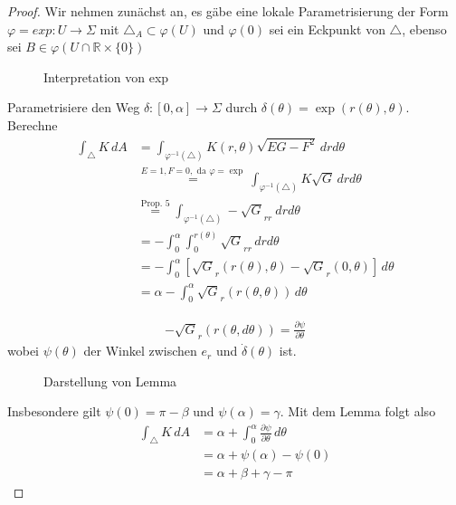 \documentclass[../main.tex]{subfiles}
\begin{document}
\begin{proof}
    Wir nehmen zunächst an, es gäbe eine lokale Parametrisierung der Form
    \(\varphi = exp : U \to \Sigma\) mit \(\triangle_A \subset \varphi(U)\)
    und \(\varphi(0)\) sei ein Eckpunkt von $\triangle$, ebenso sei $B \in \varphi (U\cap \mathbb{R} \times \{0\})$
    
    \begin{figure}[htb]
        \centering
        \def\svgwidth{40em}
        
        \caption{Interpretation von exp}        
    \end{figure}


Parametrisiere den Weg $\delta : [0,\alpha] \to \Sigma$ durch $\delta(\theta) = \exp(r(\theta), \theta)$. Berechne
\begin{align*}
    \int_{\triangle} K \,dA & = \int_{\varphi^{-1}(\triangle)} K(r,\theta) \sqrt{EG-F^{2}}\,drd\theta \\
    & \overset{E=1, F=0, \text{ da } \varphi = \exp}{=}\int_{\varphi^{-1}(\triangle)} K\sqrt{G}  \,drd\theta \\ 
    & \overset{\text{Prop. 5}}{=} \int_{\varphi^{-1}(\triangle)} -\sqrt{G}_{rr} \ drd\theta \\
    & = - \int_{0}^{\alpha} \int_{0}^{r(\theta)} \sqrt{G}_{rr}\,drd\theta \\
    & = - \int_{0}^{\alpha} \left [\sqrt{G}_r (r(\theta), \theta) - \sqrt{G}_r(0,\theta) \right ] \,d\theta \\
    & = \alpha - \int_{0}^{\alpha} \sqrt{G}_r (r(\theta,\theta))  \,d\theta 
\end{align*}

\begin{lemma*}
    \begin{align*}
        -\sqrt{G}_r (r(\theta, d\theta)) = \frac{\partial \psi}{\partial \theta}
    \end{align*} wobei $\psi(\theta)$ der Winkel zwischen $e_r$ und $\dot{\delta}(\theta)$ ist.
\end{lemma*}

\begin{figure}[htb]
    \centering
    \def\svgwidth{20em}
    
    \caption{Darstellung von Lemma}        
\end{figure}

Insbesondere gilt $\psi (0) = \pi - \beta $ und $\psi (\alpha) = \gamma$. Mit dem Lemma folgt also
\begin{align*}
    \int_{\triangle} K  \,dA &= \alpha + \int_{0}^{\alpha} \frac{\partial \psi}{\partial \theta} \,d\theta \\
    &= \alpha + \psi(\alpha) - \psi(0) \\
    &= \alpha + \beta + \gamma - \pi
\end{align*}
\end{proof}
\end{document}
